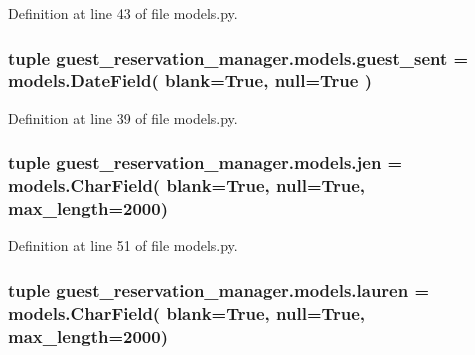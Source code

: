 Definition at line 43 of file models.\-py.

\hypertarget{namespaceguest__reservation__manager_1_1models_aef8c7a9b591a0e90990858eaa060a439}{
\subsubsection[{guest\-\_\-sent}]{\setlength{\rightskip}{0pt plus 5cm}tuple guest\-\_\-reservation\-\_\-manager.\-models.\-guest\-\_\-sent = models.\-Date\-Field( blank=True, null=True )}}\label{namespaceguest__reservation__manager_1_1models_aef8c7a9b591a0e90990858eaa060a439}


Definition at line 39 of file models.\-py.

\hypertarget{namespaceguest__reservation__manager_1_1models_ad73007564278abcdf3cd20c3b86d647d}{
\subsubsection[{jen}]{\setlength{\rightskip}{0pt plus 5cm}tuple guest\-\_\-reservation\-\_\-manager.\-models.\-jen = models.\-Char\-Field( blank=True, null=True, max\-\_\-length=2000)}}\label{namespaceguest__reservation__manager_1_1models_ad73007564278abcdf3cd20c3b86d647d}


Definition at line 51 of file models.\-py.

\hypertarget{namespaceguest__reservation__manager_1_1models_acec791a4f68f7bf9ffb24b0c7a4aa3c6}{
\subsubsection[{lauren}]{\setlength{\rightskip}{0pt plus 5cm}tuple guest\-\_\-reservation\-\_\-manager.\-models.\-lauren = models.\-Char\-Field( blank=True, null=True, max\-\_\-length=2000)}}\label{namespaceguest__reservation__manager_1_1models_acec791a4f68f7bf9ffb24b0c7a4aa3c6}


